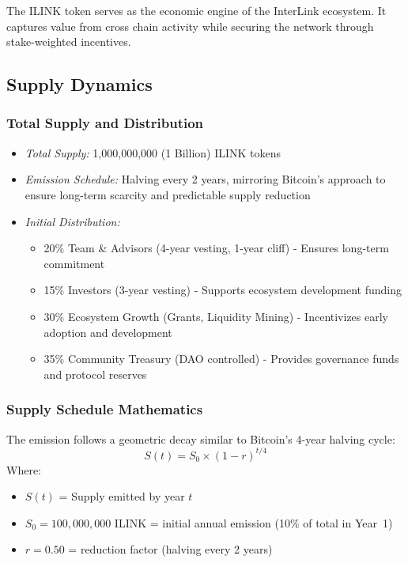 \documentclass[11pt,a4paper]{article}
\begin{document}
The ILINK token serves as the economic engine of the InterLink ecosystem. It captures value from cross chain activity while securing the network through stake-weighted incentives.

\subsection{Supply Dynamics}

\subsubsection{Total Supply and Distribution}
\begin{itemize}
    \item \textit{Total Supply:} 1,000,000,000 (1 Billion) ILINK tokens
    \item \textit{Emission Schedule:} Halving every 2 years, mirroring Bitcoin's approach to ensure long-term scarcity and predictable supply reduction
    \item \textit{Initial Distribution:}
        \begin{itemize}
            \item 20\% Team \& Advisors (4-year vesting, 1-year cliff) - Ensures long-term commitment
            \item 15\% Investors (3-year vesting) - Supports ecosystem development funding
            \item 30\% Ecosystem Growth (Grants, Liquidity Mining) - Incentivizes early adoption and development
            \item 35\% Community Treasury (DAO controlled) - Provides governance funds and protocol reserves
        \end{itemize}
\end{itemize}

\subsubsection{Supply Schedule Mathematics}
The emission follows a geometric decay similar to Bitcoin's 4-year halving cycle:
$$ S(t) = S_0 \times (1 - r)^{t/4} $$
Where:
\begin{itemize}
    \item $S(t)$ = Supply emitted by year $t$
    \item $S_0 = 100{,}000{,}000$ ILINK = initial annual emission (10\% of total in Year~1)
    \item $r = 0.50$ = reduction factor (halving every 2 years)
\end{itemize}
\end{document}
